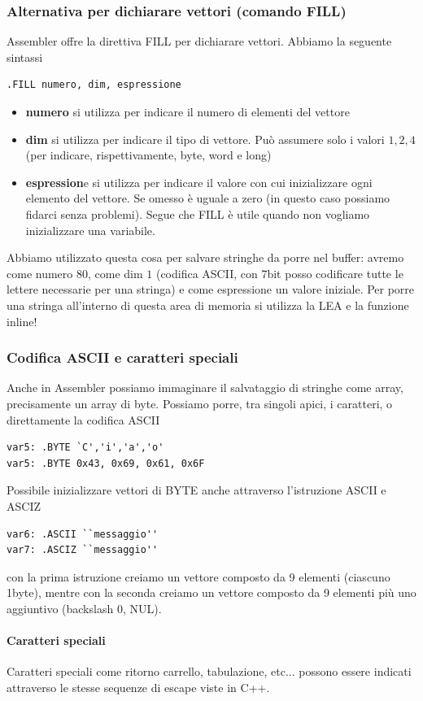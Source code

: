 \documentclass[11pt]{report}
\begin{document}
\subsubsection{Alternativa per dichiarare vettori (comando FILL)}
Assembler offre la direttiva FILL per dichiarare vettori. Abbiamo la seguente sintassi
\begin{verbatim}
.FILL numero, dim, espressione
\end{verbatim}
\begin{itemize}
\item \textbf{numero} si utilizza per indicare il numero di elementi del vettore
\item \textbf{dim} si utilizza per indicare il tipo di vettore. Può assumere solo i valori $1,2,4$ (per indicare, rispettivamente, byte, word e long)
\item \textbf{espression}e si utilizza per indicare il valore con cui inizializzare ogni elemento del vettore. Se omesso è uguale a zero (in questo caso possiamo fidarci senza problemi). Segue che FILL è utile quando non vogliamo inizializzare una variabile.
\end{itemize}
Abbiamo utilizzato questa cosa per salvare stringhe da porre nel buffer: avremo come numero $80$, come dim $1$ (codifica ASCII, con 7bit posso codificare tutte le lettere necessarie per una stringa) e come espressione un valore iniziale. Per porre una stringa all'interno di questa area di memoria si utilizza la LEA e la funzione inline!
\subsubsection{Codifica ASCII e caratteri speciali}
Anche in Assembler possiamo immaginare il salvataggio di stringhe come array, precisamente un array di byte. Possiamo porre, tra singoli apici, i caratteri, o direttamente la codifica ASCII
\begin{verbatim}
var5: .BYTE `C','i','a','o'
var5: .BYTE 0x43, 0x69, 0x61, 0x6F
\end{verbatim}
Possibile inizializzare vettori di BYTE anche attraverso l'istruzione ASCII e ASCIZ
\begin{verbatim}
var6: .ASCII ``messaggio''
var7: .ASCIZ ``messaggio''
\end{verbatim}
con la prima istruzione creiamo un vettore composto da 9 elementi (ciascuno 1byte), mentre con la seconda creiamo un vettore composto da 9 elementi più uno aggiuntivo (backslash 0, NUL).
\paragraph{Caratteri speciali} Caratteri speciali come ritorno carrello, tabulazione, etc... possono essere indicati attraverso le stesse sequenze di escape viste in C++.
\end{document}
